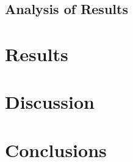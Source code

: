 \subsection{Analysis of Results} \label{sec:exp1:Analysis}




\section{Results} \label{sec:exp1:Results}


\section{Discussion} \label{sec:exp1:Discussion}


\section{Conclusions} \label{sec:Exp1:Conclusions}

